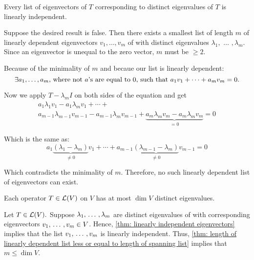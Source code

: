 \setcounter{thm}{10}
\begin{thm}
  \label{thm: linearly independent eigenvectors}
  Every list of eigenvectors of $T$ corresponding to distinct eigenvalues of $T$ is linearly independent.
\end{thm}
\begin{prf}
  Suppose the desired result is false. Then there exists a smallest list of length $m$ of linearly depen\-dent eigenvectors $v_1, \dots, v_m$ of with distinct eigenvalues $\lambda_1,$ $\dots$ $,\lambda_m$. Since an eigenvector is unequal to the zero vector, $m$ must be $\geq 2$.

  Because of the minimality of $m$ and becaue our list is linearly dependent:
  \begin{equation}
    \exists a_1, \dots, a_m$, where not $a$'s are equal to $0$, such that $a_1 v_1 + \cdots + a_m v_m = 0.
  \end{equation}

  Now we apply $T-\lambda_m I$ on both sides of the equation and get
  \begin{equation}
    \begin{gathered}
      a_1 \lambda_1 v_1 - a_1 \lambda_m v_1
      + \cdots + \\
      a_{m-1} \lambda_{m-1} v_{m-1} - a_{m-1} \lambda_{m} v_{m-1} +
      \underbrace{a_m \lambda_m v_m -a_m \lambda_m v_m}_{=0} =0
    \end{gathered}
  \end{equation}

  Which is the same as:
  \begin{equation}
    a_1 \underbrace{(\lambda_1 - \lambda_m)}_{\neq 0} v_1 + \cdots + a_{m-1} \underbrace{(\lambda_{m-1}-\lambda_{m})}_{\neq 0} v_{m-1}=0
  \end{equation}

  Which contradicts the minimality of $m$. Therefore, no such linearly dependent list of eigenvectors can exist.
\end{prf}

\begin{thm}
  \label{thm: operator cannot have more eigenvalues than dimension of vector space}
  Each operator $T \in \mathcal{L}(V)$ on $V$ has at most $\dim V$ distinct eigenvalues.
\end{thm}
\begin{prf}
  Let $T \in \mathcal{L}(V).$ Suppose $\lambda_1, {\, \ldots \,\,}, \lambda_m$ are distinct eigenvalues of with corresponding eigenvectors $v_1, {\, \ldots \,\,}, v_m \in V$. Hence, \ref{thm: linearly independent eigenvectors} implies that the list $v_1, {\, \ldots \,\,}, v_m$ is linearly independent. Thus, \ref{thm: length of linearly dependent list less or equal to length of spanning list}
  implies that $m \leq \dim V$.
\end{prf}



